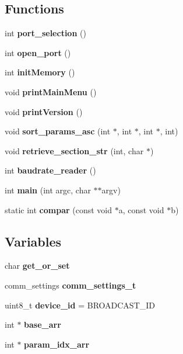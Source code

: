 \subsection*{Functions}
\begin{DoxyCompactItemize}
\item 
\mbox{\label{nmmi__param_8c_a3939d4ef4a0e2be02b1eb9e1994ec985}} 
int {\bfseries port\+\_\+selection} ()
\item 
\mbox{\label{nmmi__param_8c_abe553924eef0ba8079dc745caf1f348c}} 
int {\bfseries open\+\_\+port} ()
\item 
\mbox{\label{nmmi__param_8c_a564e2594b1cf22357d72b2e2cf7fdaf3}} 
int {\bfseries init\+Memory} ()
\item 
\mbox{\label{nmmi__param_8c_af9dce1973196a5934ee5ec20ea417324}} 
void {\bfseries print\+Main\+Menu} ()
\item 
\mbox{\label{nmmi__param_8c_a9c4b081f1e1ad60def15811c71a936f2}} 
void {\bfseries print\+Version} ()
\item 
\mbox{\label{nmmi__param_8c_a1edee49f4af1f72d451c8700b51395d9}} 
void {\bfseries sort\+\_\+params\+\_\+asc} (int $\ast$, int $\ast$, int $\ast$, int)
\item 
\mbox{\label{nmmi__param_8c_a594967f0b7d02a5c69ef34df63860de2}} 
void {\bfseries retrieve\+\_\+section\+\_\+str} (int, char $\ast$)
\item 
int \textbf{ baudrate\+\_\+reader} ()
\item 
\mbox{\label{nmmi__param_8c_a3c04138a5bfe5d72780bb7e82a18e627}} 
int {\bfseries main} (int argc, char $\ast$$\ast$argv)
\item 
\mbox{\label{nmmi__param_8c_a24aea326e519e8711ce6918e603439e3}} 
static int {\bfseries compar} (const void $\ast$a, const void $\ast$b)
\end{DoxyCompactItemize}
\subsection*{Variables}
\begin{DoxyCompactItemize}
\item 
\mbox{\label{nmmi__param_8c_a3c28322a1b5922f8c61d7cb3723b56b1}} 
char {\bfseries get\+\_\+or\+\_\+set}
\item 
\mbox{\label{nmmi__param_8c_a92153f4b70cd8ba4e9b502ccff8d28bf}} 
comm\+\_\+settings {\bfseries comm\+\_\+settings\+\_\+t}
\item 
\mbox{\label{nmmi__param_8c_aebf6cf4331fcc15f0d3ed0890e01a380}} 
uint8\+\_\+t {\bfseries device\+\_\+id} = B\+R\+O\+A\+D\+C\+A\+S\+T\+\_\+\+ID
\item 
\mbox{\label{nmmi__param_8c_a9c35d8df08d413b2a31818fbd72a71bd}} 
int $\ast$ {\bfseries base\+\_\+arr}
\item 
\mbox{\label{nmmi__param_8c_a87e551dce9c6faed6b8fe67542957aa3}} 
int $\ast$ {\bfseries param\+\_\+idx\+\_\+arr}
\end{DoxyCompactItemize}


